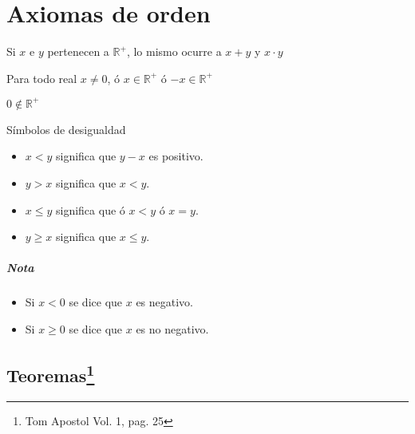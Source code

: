 \chapter{Axiomas de orden}
\begin{center}
\begin{tcolorbox}
\begin{axioma}
Si $x$ e $y$ pertenecen a $\mathbb{R}^+$, lo mismo ocurre a $x+y$\;  y \; $x\cdot y$
\end{axioma}
\begin{axioma}
Para todo real $x\neq 0$, ó $x\in \mathbb{R}^+$ ó $-x \in \mathbb{R}^+$
\end{axioma}
\begin{axioma}
$0 \notin \mathbb{R}^+$
\end{axioma}
\end{tcolorbox}
\end{center}


\begin{tcolorbox}
\begin{def.}Símbolos de desigualdad\\
\begin{center}
\begin{itemize}
\item $x<y$ significa que $y-x$ es positivo.
\item $y>x$ significa que $x<y$.
\item $x\leq y $ significa que ó $x<y$ ó $x=y$.
\item $y\geq x$ significa que $x\leq y$.
\end{itemize}
\end{center}
\end{def.}
\end{tcolorbox}
\paragraph{Nota} \begin{center}
\begin{itemize}
\item Si $x<0$ se dice que $x$ es negativo.
\item Si $x\geq 0$ se dice que $x$ es no negativo.\\
\end{itemize}
\end{center}
\section[Teoremas]{Teoremas\footnote{Tom Apostol Vol. 1, pag. 25}}

